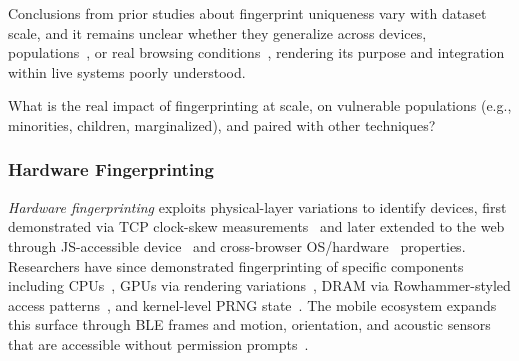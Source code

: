 %
Conclusions from prior studies about fingerprint uniqueness vary with dataset scale, 
and it remains unclear whether they generalize across devices, populations~\cite{berkeHowUniqueWhose2025,pradeepNotYourAverage2023}, or real browsing conditions~\cite{muthu2025beyond,deuserBrowsingUnicityLimits2020}, rendering its purpose and integration within live systems poorly understood.
%

\begin{opbox}
What is the real impact of fingerprinting at scale, on vulnerable populations (e.g., minorities, children, marginalized), and paired with other techniques?
\end{opbox}


\subsubsection{Hardware Fingerprinting} 
\label{sec:stateless-techniques-hardware-fingperinting}

\textit{Hardware fingerprinting} exploits physical-layer variations to identify devices, first demonstrated via TCP clock-skew measurements~\cite{kohnoRemotePhysicalDevice2005} and later extended to the web through JS-accessible device~\cite{nikiforakisCookielessMonsterExploring2013} and cross-browser OS/hardware~\cite{caoCrossBrowserFingerprintingOS2017} properties.
%
Researchers have since demonstrated fingerprinting of specific components including CPUs~\cite{trampertBrowserBasedCPUFingerprinting2022,sanchez-rolaClockClockTimeBased2018}, GPUs via rendering variations~\cite{laorDRAWNAPARTDevice2022}, DRAM via Rowhammer-styled access patterns~\cite{venugopalanFPRowhammerDRAMBasedDevice2024}, and kernel-level PRNG state~\cite{kleinCrossLayerAttacks2021,kol2023device}.
%
The mobile ecosystem expands this surface through BLE frames \cite{martinHandoffAllYour2019} and motion, orientation, and acoustic sensors that are accessible without permission prompts~\cite{zhouAcousticFingerprintingRevisited2014,zhang2019sensorid,dasWebsSixthSense2018}.
%

